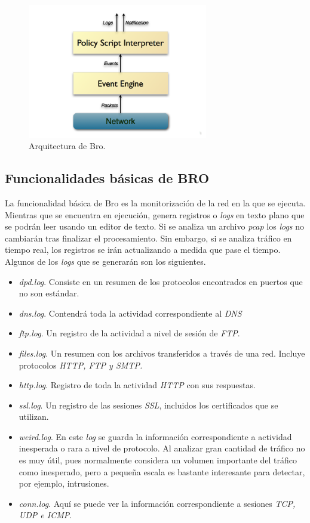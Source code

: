 \begin{figure}[H]
  \includegraphics[width=0.7\textwidth]{imagenes/arquitectura-bro.png}
  \centering
  \caption{Arquitectura de Bro.}\label{fig.arquitec}
\end{figure}

\subsection{Funcionalidades básicas de BRO}

La funcionalidad básica de Bro es la monitorización de la red en la que se ejecuta. 
Mientras que se encuentra en ejecución, genera registros o \textit{logs} en texto plano que se 
podrán leer usando un editor de texto. Si se analiza un archivo \textit{pcap} los \textit{logs} no cambiarán tras finalizar el 
procesamiento. Sin embargo, si se analiza tráfico en tiempo real, los registros se irán actualizando a medida que pase el tiempo. 
Algunos de los \textit{logs} que se generarán son los siguientes.

\begin{itemize}
\item \textit{dpd.log}. Consiste en un resumen de los protocolos encontrados en puertos que no son estándar.
\item \textit{dns.log}. Contendrá toda la actividad correspondiente al \textit{DNS}
\item \textit{ftp.log}. Un registro de la actividad a nivel de sesión de \textit{FTP}.
\item \textit{files.log}. Un resumen con los archivos transferidos a través de una red. Incluye 
protocolos \textit{HTTP, FTP y SMTP.}
\item \textit{http.log}. Registro de toda la actividad \textit{HTTP} con sus respuestas.
\item \textit{ssl.log}. Un registro de las sesiones \textit{SSL}, incluidos los certificados que se utilizan.
\item \textit{weird.log}. En este \textit{log} se guarda la información correspondiente a actividad 
inesperada o rara a nivel de protocolo. Al analizar gran cantidad de tráfico no es muy útil, pues normalmente considera un volumen 
importante del tráfico como inesperado, pero a pequeña escala es bastante interesante para detectar, por ejemplo, intrusiones.
\item \textit{conn.log}. Aquí se puede ver la información correspondiente a sesiones \textit{TCP, UDP e ICMP}.
\end{itemize}

